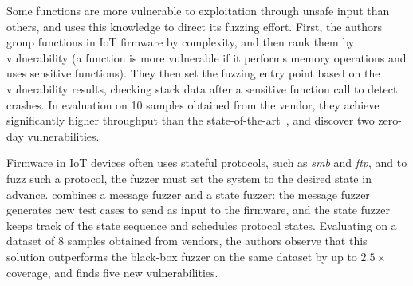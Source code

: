 Some functions are more vulnerable to exploitation through unsafe input than others, and  uses this knowledge to direct its fuzzing effort.
First, the authors group functions in IoT firmware by complexity, and then rank them by vulnerability (a function is more vulnerable if it performs memory operations and uses sensitive functions).
They then set the fuzzing entry point based on the vulnerability results, checking stack data after a sensitive function call to detect crashes.
In evaluation on 10 samples obtained from the vendor, they achieve significantly higher throughput than the state-of-the-art~\cite{chen2018iotfuzzer}, and discover two zero-day vulnerabilities.

Firmware in IoT devices often uses stateful protocols, such as \textit{smb} and \textit{ftp}, and to fuzz such a protocol, the fuzzer must set the system to the desired state in advance.
 combines a message fuzzer and a state fuzzer: the message fuzzer generates new test cases to send as input to the firmware, and the state fuzzer keeps track of the state sequence and schedules protocol states.
Evaluating on a dataset of \num{8} samples obtained from vendors, the authors observe that this solution outperforms the black-box fuzzer  on the same dataset by up to $2.5\times$ coverage, and finds five new vulnerabilities.
